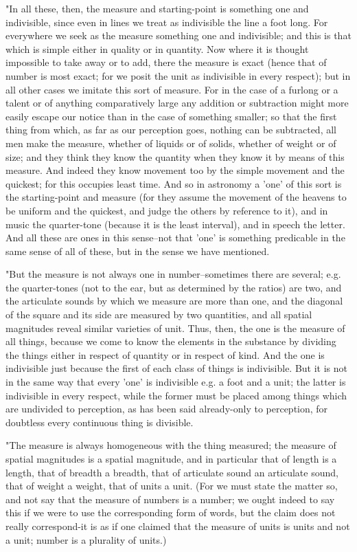 "In all these, then, the measure and starting-point is something one
and indivisible, since even in lines we treat as indivisible the line
a foot long. For everywhere we seek as the measure something one and
indivisible; and this is that which is simple either in quality or
in quantity. Now where it is thought impossible to take away or to
add, there the measure is exact (hence that of number is most exact;
for we posit the unit as indivisible in every respect); but in all
other cases we imitate this sort of measure. For in the case of a
furlong or a talent or of anything comparatively large any addition
or subtraction might more easily escape our notice than in the case
of something smaller; so that the first thing from which, as far as
our perception goes, nothing can be subtracted, all men make the measure,
whether of liquids or of solids, whether of weight or of size; and
they think they know the quantity when they know it by means of this
measure. And indeed they know movement too by the simple movement
and the quickest; for this occupies least time. And so in astronomy
a 'one' of this sort is the starting-point and measure (for they assume
the movement of the heavens to be uniform and the quickest, and judge
the others by reference to it), and in music the quarter-tone (because
it is the least interval), and in speech the letter. And all these
are ones in this sense--not that 'one' is something predicable in
the same sense of all of these, but in the sense we have mentioned.

"But the measure is not always one in number--sometimes there are
several; e.g. the quarter-tones (not to the ear, but as determined
by the ratios) are two, and the articulate sounds by which we measure
are more than one, and the diagonal of the square and its side are
measured by two quantities, and all spatial magnitudes reveal similar
varieties of unit. Thus, then, the one is the measure of all things,
because we come to know the elements in the substance by dividing
the things either in respect of quantity or in respect of kind. And
the one is indivisible just because the first of each class of things
is indivisible. But it is not in the same way that every 'one' is
indivisible e.g. a foot and a unit; the latter is indivisible in every
respect, while the former must be placed among things which are undivided
to perception, as has been said already-only to perception, for doubtless
every continuous thing is divisible. 

"The measure is always homogeneous with the thing measured; the measure
of spatial magnitudes is a spatial magnitude, and in particular that
of length is a length, that of breadth a breadth, that of articulate
sound an articulate sound, that of weight a weight, that of units
a unit. (For we must state the matter so, and not say that the measure
of numbers is a number; we ought indeed to say this if we were to
use the corresponding form of words, but the claim does not really
correspond-it is as if one claimed that the measure of units is units
and not a unit; number is a plurality of units.) 

